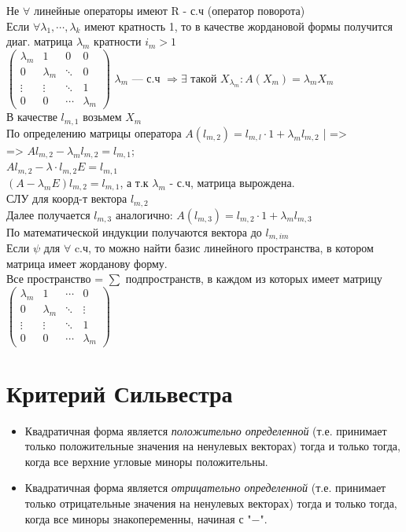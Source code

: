 \documentclass[12pt]{article}
\begin{document}
Не \(\forall\) линейные операторы имеют R - с.ч (оператор поворота)\\
Если  \(\forall \lambda_1,\cdots,\lambda_k\) имеют кратность 1, то в качестве жордановой формы получится диаг. матрица \(\lambda_m\) кратности \(i_m > 1\) \\
$
    \begin{pmatrix}
        \lambda_m & 1         & 0      & 0         \\
        0         & \lambda_m & \ddots & 0         \\
        \vdots    & \vdots    & \ddots & 1         \\
        0         & 0         & \cdots & \lambda_m
    \end{pmatrix}$ $\lambda_m$ --- с.ч $\Rightarrow \exists$ такой $X_{\lambda_m} : A(X_m) = \lambda_mX_m$\\
В качестве $l_{m,1}$ возьмем $X_m$\\
По определению матрицы оператора $A(l_{m, 2}) = l_{m, l} \cdot 1 + \lambda_ml_{m, 2}$ | =>\\
=> $Al_{m, 2} - \lambda_ml_{m, 2} = l_{m, 1}$;\\
$Al_{m, 2} - \lambda \cdot l_{m, 2}E = l_{m, 1}$\\
$(A - \lambda_mE)l_{m, 2} = l_{m, 1}$, а т.к $\lambda_m$ - с.ч, матрица вырождена. \\
СЛУ для коорд-т вектора $l_{m, 2}$ \\
Далее получается $l_{m, 3}$ аналогично: $A(l_{m, 3}) = l_{m, 2} \cdot 1 + \lambda_ml_{m, 3}$\\
По математической индукции получаются вектора до $l_{m, im}$\\
Если $\psi$ для $\forall$ c.ч, то можно найти базис линейного пространства, в котором матрица имеет жорданову форму.\\
Все пространство = $\sum$ подпространств, в каждом из которых имеет матрицу
$
    \begin{pmatrix}
        \lambda_m & 1         & \cdots & 0         \\
        0         & \lambda_m & \ddots & \vdots    \\
        \vdots    & \vdots    & \ddots & 1         \\
        0         & 0         & \cdots & \lambda_m
    \end{pmatrix}
$

\section{Критерий Сильвестра}
\begin{itemize}
    \item Квадратичная форма является
          \textit{положительно определенной} (т.е.
          принимает только положительные значения
          на ненулевых векторах) тогда и только тогда,
          когда все верхние угловые миноры положительны.
    \item Квадратичная форма является
          \textit{отрицательно определенной} (т.е.
          принимает только отрицательные значения
          на ненулевых векторах) тогда и только тогда,
          когда все миноры знакопеременны, начиная с "$-$".
\end{itemize}
\end{document}

